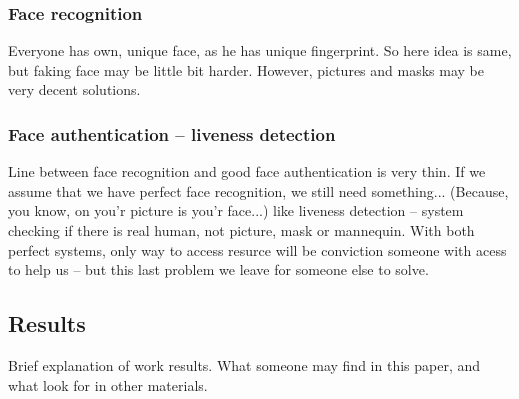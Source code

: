         \subsubsection{Face recognition}
            Everyone has own, unique face, as he has unique fingerprint.
            So here idea is same,
            but faking face may be little bit harder.
            However, pictures and masks may be very decent solutions. %

        \subsubsection{Face authentication -- liveness detection}
            Line between face recognition and
            good face authentication is very thin.
            If we assume that we have perfect face recognition,
            we still need something... (Because, you know, on you'r picture is you'r face...)
            like liveness detection --
            system checking if there is real human, not picture, mask or mannequin.
            With both perfect systems, only way to access resurce will be
            conviction someone with acess to help us -- but this last problem
            we leave for someone else to solve.

    \subsection{Results}
        Brief explanation of work results.
        What someone may find in this paper,
        and what look for in other materials.
